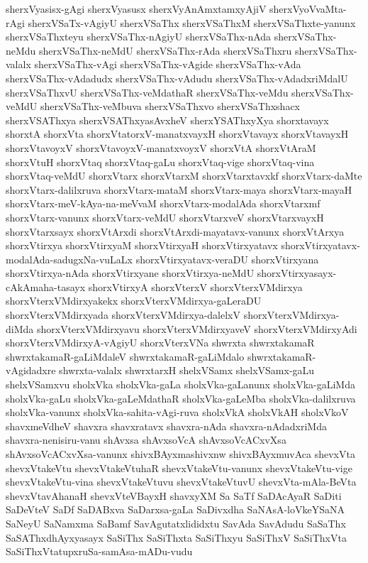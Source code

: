 {sherxVyasisx-gAgi
sherxVyasusx
sherxVyAnAmxtamxyAjiV
sherxVyoVvaMta-rAgi
sherxVSaTx-vAgiyU
sherxVSaThx
sherxVSaThxM
sherxVSaThxte-yanunx
sherxVSaThxteyu
sherxVSaThx-nAgiyU
sherxVSaThx-nAda
sherxVSaThx-neMdu
sherxVSaThx-neMdU
sherxVSaThx-rAda
sherxVSaThxru
sherxVSaThx-valalx
sherxVSaThx-vAgi
sherxVSaThx-vAgide
sherxVSaThx-vAda
sherxVSaThx-vAdadudx
sherxVSaThx-vAdudu
sherxVSaThx-vAdadxriMdalU
sherxVSaThxvU
sherxVSaThx-veMdathaR
sherxVSaThx-veMdu
sherxVSaThx-veMdU
sherxVSaThx-veMbuva
sherxVSaThxvo
sherxVSaThxshacx
sherxVSAThxya
sherxVSAThxyasAvxheV
sherxYSAThxyXya
shorxtavayx
shorxtA
shorxVta
shorxVtatorxV-manatxvayxH
shorxVtavayx
shorxVtavayxH
shorxVtavoyxV
shorxVtavoyxV-manatxvoyxV
shorxVtA
shorxVtAraM
shorxVtuH
shorxVtaq
shorxVtaq-gaLu
shorxVtaq-vige
shorxVtaq-vina
shorxVtaq-veMdU
shorxVtarx
shorxVtarxM
shorxVtarxtavxkf
shorxVtarx-daMte
shorxVtarx-dalilxruva
shorxVtarx-mataM
shorxVtarx-maya
shorxVtarx-mayaH
shorxVtarx-meV-kAya-na-meVvaM
shorxVtarx-modalAda
shorxVtarxmf
shorxVtarx-vanunx
shorxVtarx-veMdU
shorxVtarxveV
shorxVtarxvayxH
shorxVtarxsayx
shorxVtArxdi
shorxVtArxdi-mayatavx-vanunx
shorxVtArxya
shorxVtirxya
shorxVtirxyaM
shorxVtirxyaH
shorxVtirxyatavx
shorxVtirxyatavx-modalAda-sadugxNa-vuLaLx
shorxVtirxyatavx-veraDU
shorxVtirxyana
shorxVtirxya-nAda
shorxVtirxyane
shorxVtirxya-neMdU
shorxVtirxyasayx-cAkAmaha-tasayx
shorxVtirxyA
shorxVterxV
shorxVterxVMdirxya
shorxVterxVMdirxyakekx
shorxVterxVMdirxya-gaLeraDU
shorxVterxVMdirxyada
shorxVterxVMdirxya-dalelxV
shorxVterxVMdirxya-diMda
shorxVterxVMdirxyavu
shorxVterxVMdirxyaveV
shorxVterxVMdirxyAdi
shorxVterxVMdirxyA-vAgiyU
shorxVterxVNa
shwrxta
shwrxtakamaR
shwrxtakamaR-gaLiMdaleV
shwrxtakamaR-gaLiMdalo
shwrxtakamaR-vAgidadxre
shwrxta-valalx
shwrxtarxH
shelxVSamx
shelxVSamx-gaLu
shelxVSamxvu
sholxVka
sholxVka-gaLa
sholxVka-gaLanunx
sholxVka-gaLiMda
sholxVka-gaLu
sholxVka-gaLeMdathaR
sholxVka-gaLeMba
sholxVka-dalilxruva
sholxVka-vanunx
sholxVka-sahita-vAgi-ruva
sholxVkA
sholxVkAH
sholxVkoV
shavxmeVdheV
shavxra
shavxratavx
shavxra-nAda
shavxra-nAdadxriMda
shavxra-nenisiru-vanu
shAvxsa
shAvxsoVcA
shAvxsoVcACxvXsa
shAvxsoVcACxvXsa-vanunx
shivxBAyxmashivxnw
shivxBAyxmuvAca
shevxVta
shevxVtakeVtu
shevxVtakeVtuhaR
shevxVtakeVtu-vanunx
shevxVtakeVtu-vige
shevxVtakeVtu-vina
shevxVtakeVtuvu
shevxVtakeVtuvU
shevxVta-mAla-BeVta
shevxVtavAhanaH
shevxVteVBayxH
shavxyXM
Sa
SaTf
SaDAcAyaR
SaDiti
SaDeVteV
SaDf
SaDABxva
SaDarxsa-gaLa
SaDivxdha
SaNAsA-loVkeYSaNA
SaNeyU
SaNamxma
SaBamf
SavAgutatxlididxtu
SavAda
SavAdudu
SaSaThx
SaSAThxdhAyxyasayx
SaSiThx
SaSiThxta
SaSiThxyu
SaSiThxV
SaSiThxVta
SaSiThxVtatupxruSa-samAsa-mADu-vudu
}
